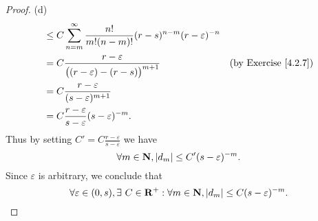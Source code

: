 \begin{proof}{(d)}
\begin{align*}
                                    & \leq C \sum_{n = m}^\infty \frac{n!}{m! (n - m)!} (r - s)^{n - m} (r - \varepsilon)^{-n}                                          \\
                                    & = C \frac{r - \varepsilon}{\big((r - \varepsilon) - (r - s)\big)^{m + 1}}                      & \text{(by Exercise \ref{4.2.7})} \\
                                    & = C \frac{r - \varepsilon}{(s - \varepsilon)^{m + 1}}                                                                             \\
                                    & = C \frac{r - \varepsilon}{s - \varepsilon} (s - \varepsilon)^{-m}.
    \end{align*}
    Thus by setting \(C' = C \frac{r - \varepsilon}{s - \varepsilon}\) we have
    \[
        \forall m \in \mathbf{N}, \left\lvert d_m\right\rvert \leq C' (s - \varepsilon)^{-m}.
    \]
    Since \(\varepsilon\) is arbitrary, we conclude that
    \[
        \forall \varepsilon \in (0, s), \exists\ C \in \mathbf{R}^+ : \forall m \in \mathbf{N}, \left\lvert d_m\right\rvert \leq C (s - \varepsilon)^{-m}.
    \]
\end{proof}

